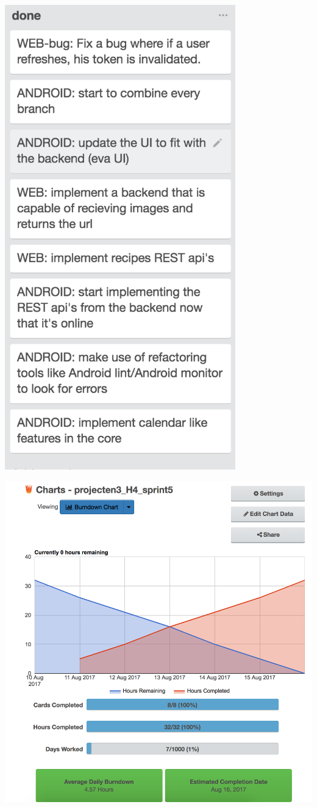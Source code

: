 \includegraphics[width=10cm]{img/backlog_week5.png}


\includegraphics[width=15cm]{img/burndown_week5.png}

